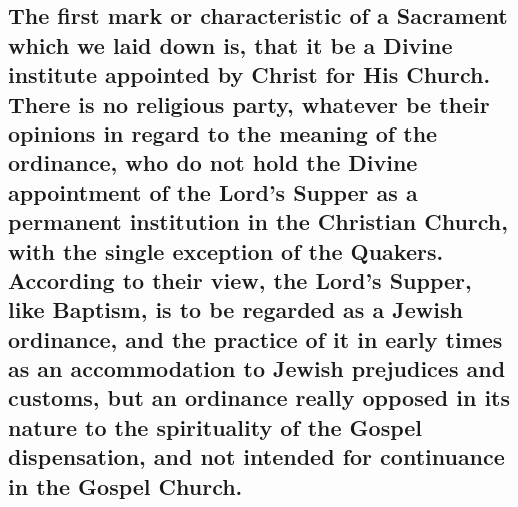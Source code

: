 \documentclass[english,]{book}
\begin{document}
\hypertarget{the-first-mark-or-characteristic-of-a-sacrament-which-we-laid-down-is-that-it-be-a-divine-institute-appointed-by-christ-for-his-church.-there-is-no-religious-party-whatever-be-their-opinions-in-regard-to-the-meaning-of-the-ordinance-who-do-not-hold-the-divine-appointment-of-the-lords-supper-as-a-permanent-institution-in-the-christian-church-with-the-single-exception-of-the-quakers.-according-to-their-view-the-lords-supper-like-baptism-is-to-be-regarded-as-a-jewish-ordinance-and-the-practice-of-it-in-early-times-as-an-accommodation-to-jewish-prejudices-and-customs-but-an-ordinance-really-opposed-in-its-nature-to-the-spirituality-of-the-gospel-dispensation-and-not-intended-for-continuance-in-the-gospel-church.}{%
\subsection{The first mark or characteristic of a Sacrament which we laid down is, that it be a Divine institute appointed by Christ for His Church. There is no religious party, whatever be their opinions in regard to the meaning of the ordinance, who do not hold the Divine appointment of the Lord's Supper as a permanent institution in the Christian Church, with the single exception of the Quakers. According to their view, the Lord's Supper, like Baptism, is to be regarded as a Jewish ordinance, and the practice of it in early times as an accommodation to Jewish prejudices and customs, but an ordinance really opposed in its nature to the spirituality of the Gospel dispensation, and not intended for continuance in the Gospel Church.}\label{the-first-mark-or-characteristic-of-a-sacrament-which-we-laid-down-is-that-it-be-a-divine-institute-appointed-by-christ-for-his-church.-there-is-no-religious-party-whatever-be-their-opinions-in-regard-to-the-meaning-of-the-ordinance-who-do-not-hold-the-divine-appointment-of-the-lords-supper-as-a-permanent-institution-in-the-christian-church-with-the-single-exception-of-the-quakers.-according-to-their-view-the-lords-supper-like-baptism-is-to-be-regarded-as-a-jewish-ordinance-and-the-practice-of-it-in-early-times-as-an-accommodation-to-jewish-prejudices-and-customs-but-an-ordinance-really-opposed-in-its-nature-to-the-spirituality-of-the-gospel-dispensation-and-not-intended-for-continuance-in-the-gospel-church.}}
\end{document}
